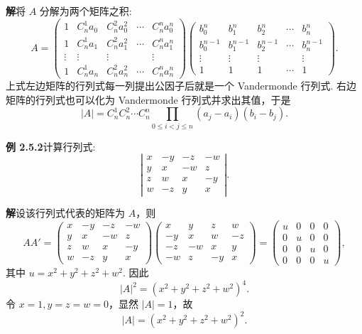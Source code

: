 \documentclass[UTF8, 12pt, fontset=fandol, oneside]{ctexart}
\begin{document}
\noindent\textbf{解}\quad 将 $A$ 分解为两个矩阵之积:
\[
A=
\left(\begin{array}{ccccc}
1 & C_n^1a_0 & C_n^2a_0^2 & \cdots & C_n^na_0^n\\
1 & C_n^1a_1 & C_n^2a_1^2 & \cdots & C_n^na_1^n\\
\vdots & \vdots & \vdots & & \vdots\\
1 & C_n^1a_n & C_n^2a_n^2 & \cdots & C_n^na_n^n
\end{array}\right)
\left(\begin{array}{ccccc}
b_0^n & b_1^n & b_2^n & \cdots & b_n^n\\
b_0^{n-1} & b_1^{n-1} & b_2^{n-1} & \cdots & b_n^{n-1}\\
\vdots & \vdots & \vdots & & \vdots\\
1 & 1 & 1 & \cdots & 1
\end{array}\right).
\]
上式左边矩阵的行列式每一列提出公因子后就是一个 Vandermonde 行列式. 右边矩阵的行列式也可以化为 Vandermonde 行列式并求出其值，于是
\[
|A|=C_n^1C_n^2\cdots C_n^n\prod_{0\le i<j\le n}(a_j-a_i)(b_i-b_j).
\]

\noindent\textbf{例 2.5.2}\quad 计算行列式:
\[
\left|\begin{array}{rrrr}
x & -y & -z & -w\\
y & x & -w & z\\
z & w & x & -y\\
w & -z & y & x
\end{array}\right|.
\]

\noindent\textbf{解}\quad 设该行列式代表的矩阵为 $A$，则
\[
AA'=
\left(\begin{array}{rrrr}
x & -y & -z & -w\\
y & x & -w & z\\
z & w & x & -y\\
w & -z & y & x
\end{array}\right)
\left(\begin{array}{rrrr}
x & y & z & w\\
-y & x & w & -z\\
-z & -w & x & y\\
-w & z & -y & x
\end{array}\right)
=
\left(\begin{array}{cccc}
u & 0 & 0 & 0\\
0 & u & 0 & 0\\
0 & 0 & u & 0\\
0 & 0 & 0 & u
\end{array}\right),
\]
其中 $u=x^2+y^2+z^2+w^2$. 因此
\[
|A|^2=(x^2+y^2+z^2+w^2)^4.
\]
令 $x=1,y=z=w=0$，显然 $|A|=1$，故
\[
|A|=(x^2+y^2+z^2+w^2)^2.
\]
\end{document}
